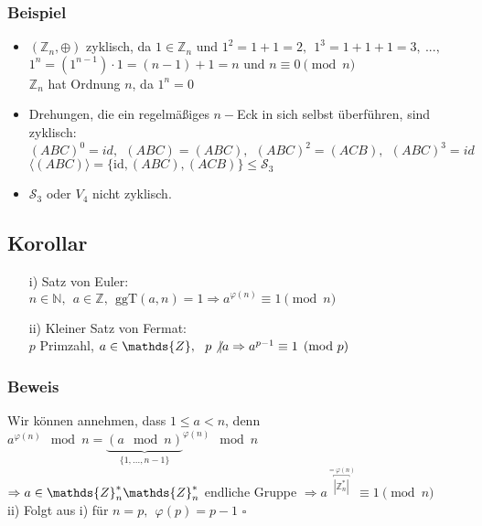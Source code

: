 \documentclass[12pt,titlepage, pdf]{article}
\newcommand{\id}{\textrm{id}}
\renewcommand{\>}{\rightarrow}
\renewcommand{\*}{\cdot}
\renewcommand{\phi}{\varphi}
\begin{document}
	      \subsubsection*{Beispiel}
	      \begin{itemize}
	      	\item $(\mathds{Z}_n, \oplus)$ zyklisch, da $1 \in \mathds{Z}_n$ und $1^2 = 1 + 1 = 2,~~ 1^3 = 1 + 1 +1 = 3,~...,$\\$ 1^n = (1^{n-1}) \cdot 1 = (n -1) + 1 = n\textrm{ und } n \equiv 0 \pmod{n}$ \\
	      	      $\mathds{Z}_n$ hat Ordnung $n$, da $1^n = 0$
	      	\item Drehungen, die ein regelmäßiges $n-$Eck in sich selbst überführen, sind zyklisch: \\
	      	      $(ABC)^0 = id,~~ (ABC) = (ABC),~~ (ABC)^2 = (ACB),~~ (ABC)^3 = id$\\
	      	      $\langle (ABC) \rangle = \{\id, (ABC), (ACB)\} \leq \mathscr{S}_3$
	      	\item $\mathscr{S}_3$ oder $V_4$ nicht zyklisch.
	      \end{itemize}
	      \subsection{Korollar}
	      \begin{itemize}
	      	\item[i)] Satz von Euler:\\ $n \in \mathds{N},~~ a \in \mathds{Z},~~ \text{ggT}(a,n) = 1 \Rightarrow a^{\phi(n)} \equiv 1 \pmod{n}$
	      	\item[ii)] Kleiner Satz von Fermat:\\ $p$ Primzahl, $a \in \mathds{Z},~~ p \not\vert a \Rightarrow a^{p-1} \equiv 1 \pmod{p}$
	      \end{itemize}
	      \subsubsection*{Beweis}
	      Wir können annehmen, dass $1 \leq a < n$, denn \\$a^{\phi(n)} \mod n = {\underbrace{(a \mod n)}_{\{1,...,n-1\}}}^{\phi(n)}\mod n$ \\
	      $\Rightarrow a \in \mathds{Z}^*_n \\
	      \mathds{Z}^*_n$ endliche Gruppe $\Rightarrow a^{\overbracket{|\mathds{Z}^*_n|}^{ = \phi(n)}} \equiv 1 \pmod{n}$\\
	      ii) Folgt aus i) für $n = p,~~ \phi(p) = p-1$
	      \hfill$\square$
	      \newpage
\end{document}
